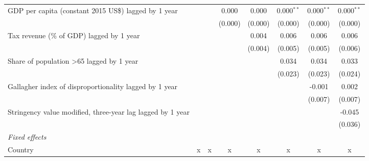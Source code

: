 \begin{tabular}{lccccccc}
   GDP per capita (constant 2015 US\$) lagged by 1 year                                                 &              &              & 0.000        & 0.000        & 0.000$^{**}$ & 0.000$^{**}$ & 0.000$^{**}$\\   
                                                                                                        &              &              & (0.000)      & (0.000)      & (0.000)      & (0.000)      & (0.000)\\   
   Tax revenue (\% of GDP) lagged by 1 year                                                             &              &              &              & 0.004        & 0.006        & 0.006        & 0.006\\   
                                                                                                        &              &              &              & (0.004)      & (0.005)      & (0.005)      & (0.006)\\   
   Share of population >65 lagged by 1 year                                                             &              &              &              &              & 0.034        & 0.034        & 0.033\\   
                                                                                                        &              &              &              &              & (0.023)      & (0.023)      & (0.024)\\   
   Gallagher index of disproportionality lagged by 1 year                                               &              &              &              &              &              & -0.001       & 0.002\\   
                                                                                                        &              &              &              &              &              & (0.007)      & (0.007)\\   
   Stringency value modified, three-year lag lagged by 1 year                                           &              &              &              &              &              &              & -0.045\\   
                                                                                                        &              &              &              &              &              &              & (0.036)\\   
   \emph{Fixed effects}\\
   Country                                                                                              & x            & x            & x            & x            & x            & x            & x\\  

\end{tabular}
